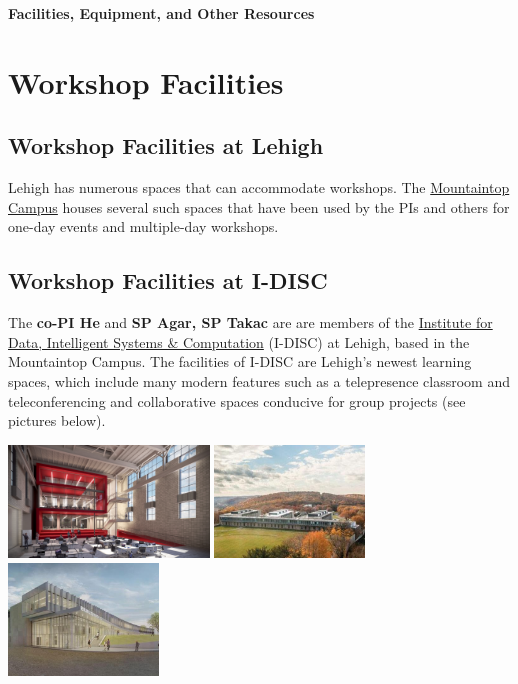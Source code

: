 \documentclass[11pt]{SelfArx}
\begin{document}
\pagestyle{plain}

\begin{center}
{
\color{color1}
\bf \large
  Facilities, Equipment, and Other Resources
 }
%
%
 \end{center}

\section*{Workshop Facilities}

\subsection*{Workshop Facilities at Lehigh}
Lehigh has numerous spaces that can accommodate workshops.  The \href{https://lehighmountaintop.wordpress.com/learn-more/}{Mountaintop Campus} houses several such spaces that have been used by the PIs and others for one-day events and multiple-day workshops. 

\subsection*{Workshop Facilities at I-DISC}
The \textbf{co-PI He} and \textbf{SP Agar, SP Takac} are are members of the \href{https://idisc.lehigh.edu/}{Institute for Data, Intelligent Systems \& Computation} (I-DISC) at Lehigh, based in the Mountaintop Campus.  The facilities of I-DISC are Lehigh's newest learning spaces, which include many modern features such as a telepresence
classroom and teleconferencing and collaborative spaces conducive for group projects (see pictures below).\\
\begin{center}
\includegraphics[height=3cm]{1012131_00_N5_bdc1_HERO.jpeg}
\includegraphics[height=3cm]{Mountaintop-BuildingC.jpg}
\includegraphics[height=3cm]{briefs-mountaintop-tech-building-initiative.jpg}
\end{center}
\end{document}
